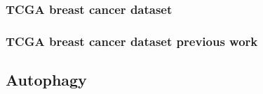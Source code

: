         \subsubsection{TCGA breast cancer dataset}

        \subsubsection{TCGA breast cancer dataset previous work}
        
        
        
        
    \subsection{Autophagy}
    


